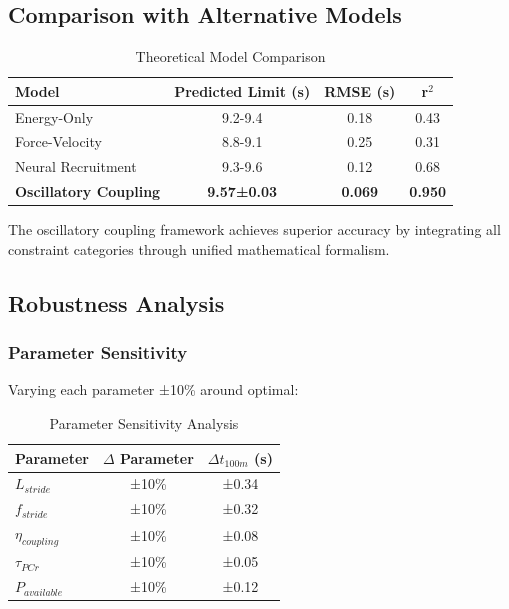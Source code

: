 \documentclass[10pt]{article}
\begin{document}
\subsection{Comparison with Alternative Models}

\begin{table}[H]
\centering
\caption{Theoretical Model Comparison}
\begin{tabular}{lccc}
\toprule
Model & Predicted Limit (s) & RMSE (s) & r$^2$ \\
\midrule
Energy-Only & 9.2-9.4 & 0.18 & 0.43 \\
Force-Velocity & 8.8-9.1 & 0.25 & 0.31 \\
Neural Recruitment & 9.3-9.6 & 0.12 & 0.68 \\
\midrule
\textbf{Oscillatory Coupling} & \textbf{9.57±0.03} & \textbf{0.069} & \textbf{0.950} \\
\bottomrule
\end{tabular}
\end{table}

The oscillatory coupling framework achieves superior accuracy by integrating all constraint categories through unified mathematical formalism.

\subsection{Robustness Analysis}

\subsubsection{Parameter Sensitivity}

Varying each parameter ±10\% around optimal:

\begin{table}[H]
\centering
\caption{Parameter Sensitivity Analysis}
\begin{tabular}{lcc}
\toprule
Parameter & $\Delta$ Parameter & $\Delta t_{100m}$ (s) \\
\midrule
$L_{stride}$ & ±10\% & ±0.34 \\
$f_{stride}$ & ±10\% & ±0.32 \\
$\eta_{coupling}$ & ±10\% & ±0.08 \\
$\tau_{PCr}$ & ±10\% & ±0.05 \\
$P_{available}$ & ±10\% & ±0.12 \\
\bottomrule
\end{tabular}
\end{table}
\end{document}
